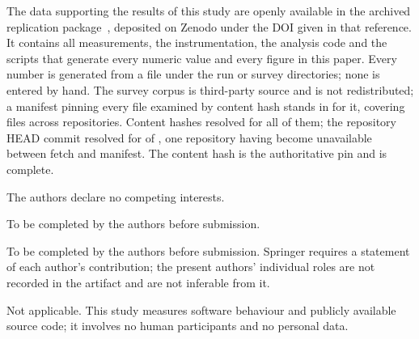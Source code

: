 \documentclass[pdflatex,sn-basic,twocolumn]{sn-jnl}%
\newcommand{\SNJNL}{}%
\newif\ifshowauthornotes
\newcommand{\TODO}[1]{\ifshowauthornotes\textcolor{notered}{\textbf{#1}}\else#1\fi}
\begin{document}
\backmatter

The data supporting the results of this study are openly available in the
archived replication package~\cite{artifact2026}, deposited on Zenodo under the
DOI given in that reference. It contains all measurements, the instrumentation,
the analysis code and the scripts that generate every numeric value and every
figure in this paper. Every number is generated from a file under the run or
survey directories; none is entered by hand. The survey corpus is third-party
source and is not redistributed; a manifest pinning every file examined by
content hash stands in for it, covering \ManifestFiles{} files across
\ManifestRepos{} repositories. Content hashes resolved for all of them; the
repository HEAD commit resolved for \ManifestHeadResolved{} of \ManifestFiles,
one repository having become unavailable between fetch and manifest. The content
hash is the authoritative pin and is complete.

The authors declare no competing interests.

\TODO{To be completed by the authors before submission.}

\TODO{To be completed by the authors before submission. Springer requires a
statement of each author's contribution; the present authors' individual roles
are not recorded in the artifact and are not inferable from it.}

Not applicable. This study measures software behaviour and publicly available
source code; it involves no human participants and no personal data.

\ifdefined\SNJNL\else\fi

\end{document}
